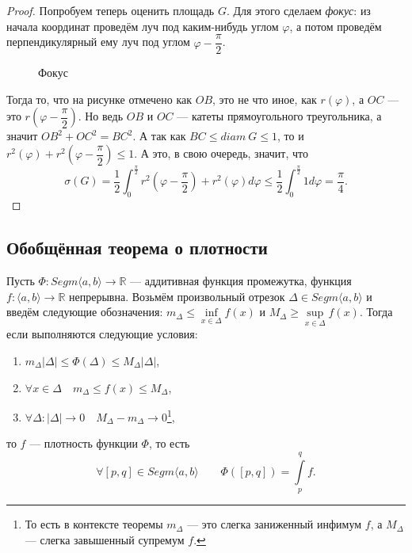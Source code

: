 \begin{proof}
	Попробуем теперь оценить площадь \(G\).	Для этого сделаем \textit{фокус}: из начала координат проведём луч под каким-нибудь углом \(\varphi\), а потом проведём перпендикулярный ему луч под углом \(\varphi - \dfrac{\pi}{2}\).
	\begin{figure}[h!]
		\caption{Фокус}
	\end{figure}
	
	Тогда то, что на рисунке отмечено как \(OB\), это не что иное, как \(r(\varphi)\), а \(OC\) --- это \(r \left(\varphi - \dfrac{\pi}{2} \right)\). Но ведь \(OB\) и \(OC\) --- катеты прямоугольного треугольника, а значит \({OB}^2 + {OC}^2 = {BC}^2\). А так как \(BC \leqslant diam \ G \leqslant 1\), то и \(r^2(\varphi) + r^2 \left(\varphi - \dfrac{\pi}{2} \right) \leqslant 1\). А это, в свою очередь, значит, что \[
	\sigma(G) = \frac{1}{2} \int_{0}^{\frac{\pi}{2}} r^2 \left(\varphi - \frac{\pi}{2} \right) +  r^2(\varphi) d\varphi \leqslant \frac{1}{2} \int_{0}^{\frac{\pi}{2}} 1 d\varphi = \frac{\pi}{4}.
	\]
\end{proof}

\subsection{Обобщённая теорема о плотности}

\hypertarget{plotn}{}
\begin{theorem}
	Пусть \(\Phi \colon Segm \langle a, b \rangle \to \mathbb{R}\) --- аддитивная функция промежутка, функция \(f \colon \langle a, b \rangle \to \mathbb{R}\) непрерывна. Возьмём произвольный отрезок \(\Delta \in Segm \langle a, b \rangle\) и введём следующие обозначения: \(m_\Delta \leqslant \inf\limits_{x \in \Delta} f(x)\) и \(M_\Delta \geqslant \sup\limits_{x \in \Delta} f(x)\). Тогда если выполняются следующие условия:
	\begin{enumerate}
		\item \label{plotn_1} \(m_\Delta |\Delta| \leqslant \Phi(\Delta) \leqslant M_\Delta |\Delta|\),
		\item \label{plotn_2} \(\forall x \in \Delta \quad m_\Delta \leqslant f(x) \leqslant M_\Delta\),
		\item \label{plotn_3} \(\forall \Delta : |\Delta| \to 0 \quad M_\Delta - m_\Delta \to 0\)\footnote{То есть в контексте теоремы \(m_\Delta\) --- это слегка заниженный инфимум \(f\), а \(M_\Delta\) --- слегка завышенный супремум \(f\).},
	\end{enumerate}
	то \(f\) --- плотность функции \(\Phi\), то есть \[
		\forall [p, q] \in Segm \langle a, b \rangle \qquad \Phi([p, q]) = \int\limits_p^q f.
	\]
\end{theorem}


